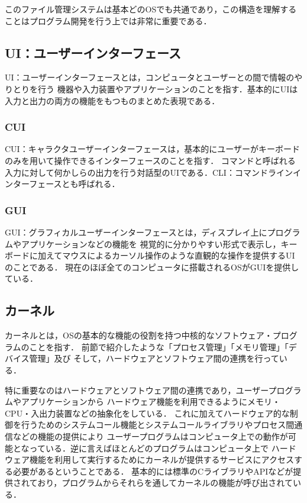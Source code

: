\documentclass[autodetect-engine,dvi=dvipdfmx,ja=standard,a4j]{bxjsarticle}
\begin{document}
このファイル管理システムは基本どのOSでも共通であり，この構造を理解することはプログラム開発を行う上では非常に重要である．

\subsection{UI：ユーザーインターフェース}
UI：ユーザーインターフェースとは，コンピュータとユーザーとの間で情報のやりとりを行う
機器や入力装置やアプリケーションのことを指す．基本的にUIは入力と出力の両方の機能をもつものまとめた表現である．

\subsubsection{CUI}
CUI：キャラクタユーザーインターフェースは，基本的にユーザーがキーボードのみを用いて操作できるインターフェースのことを指す．
コマンドと呼ばれる入力に対して何かしらの出力を行う対話型のUIである．CLI：コマンドラインインターフェースとも呼ばれる．

\subsubsection{GUI}
GUI：グラフィカルユーザーインターフェースとは，ディスプレイ上にプログラムやアプリケーションなどの機能を
視覚的に分かりやすい形式で表示し，キーボードに加えてマウスによるカーソル操作のような直観的な操作を提供するUIのことである．
現在のほぼ全てのコンピュータに搭載されるOSがGUIを提供している．

\subsection{カーネル}
カーネルとは，OSの基本的な機能の役割を持つ中核的なソフトウェア・プログラムのことを指す．
前節で紹介したような「プロセス管理」「メモリ管理」「デバイス管理」及び
そして，ハードウェアとソフトウェア間の連携を行っている．

特に重要なのはハードウェアとソフトウェア間の連携であり，ユーザープログラムやアプリケーションから
ハードウェア機能を利用できるようにメモリ・CPU・入出力装置などの抽象化をしている．
これに加えてハードウェア的な制御を行うためのシステムコール機能とシステムコールライブラリやプロセス間通信などの機能の提供により
ユーザープログラムはコンピュータ上での動作が可能となっている．逆に言えばほとんどのプログラムはコンピュータ上で
ハードウェア機能を利用して実行するためにカーネルが提供するサービスにアクセスする必要があるということである．
基本的には標準のCライブラリやAPIなどが提供されており，プログラムからそれらを通してカーネルの機能が呼び出されている．
\end{document}
